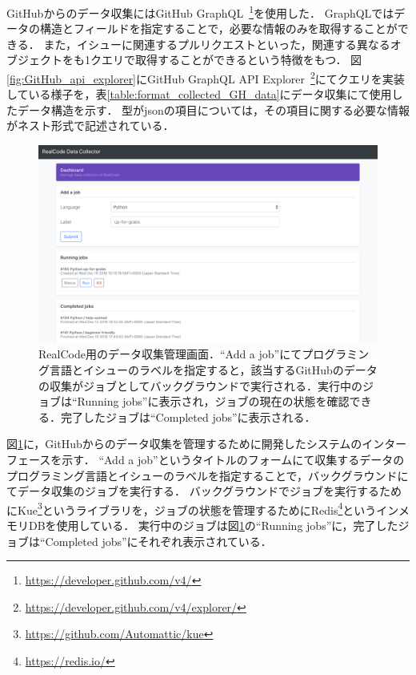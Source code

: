 GitHubからのデータ収集にはGitHub GraphQL~\footnote{\url{https://developer.github.com/v4/}}を使用した．
GraphQLではデータの構造とフィールドを指定することで，必要な情報のみを取得することができる．
また，イシューに関連するプルリクエストといった，関連する異なるオブジェクトをも1クエリで取得することができるという特徴をもつ．
図\ref{fig:GitHub_api_explorer}にGitHub GraphQL API Explorer~\footnote{\url{https://developer.github.com/v4/explorer/}}にてクエリを実装している様子を，表\ref{table:format_collected_GH_data}にデータ収集にて使用したデータ構造を示す．
型がjsonの項目については，その項目に関する必要な情報がネスト形式で記述されている．

\begin{figure}[t]
  \centering
  \includegraphics[width=1.0\columnwidth]{realcode-data-collector-screenshot.png}
  \caption{RealCode用のデータ収集管理画面．``Add a job''にてプログラミング言語とイシューのラベルを指定すると，該当するGitHubのデータの収集がジョブとしてバックグラウンドで実行される．実行中のジョブは``Running jobs''に表示され，ジョブの現在の状態を確認できる．完了したジョブは``Completed jobs''に表示される．}
  \label{fig:realcode-data-collector}
\end{figure}

図\ref{fig:realcode-data-collector}に，GitHubからのデータ収集を管理するために開発したシステムのインターフェースを示す．
``Add a job''というタイトルのフォームにて収集するデータのプログラミング言語とイシューのラベルを指定することで，バックグラウンドにてデータ収集のジョブを実行する．
バックグラウンドでジョブを実行するためにKue\footnote{\url{https://github.com/Automattic/kue}}というライブラリを，ジョブの状態を管理するためにRedis\footnote{\url{https://redis.io/}}というインメモリDBを使用している．
実行中のジョブは図\ref{fig:realcode-data-collector}の``Running jobs''に，完了したジョブは``Completed jobs''にそれぞれ表示されている．

